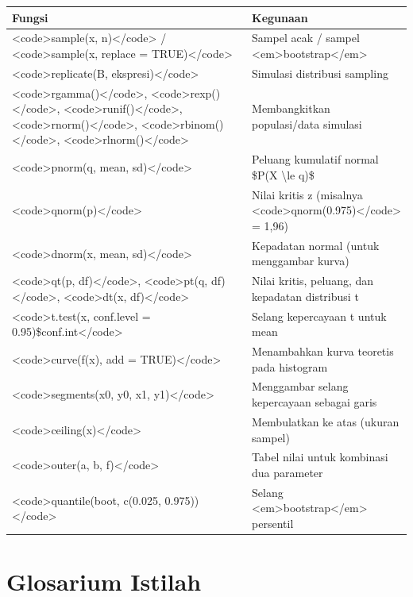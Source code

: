 \documentclass[
  indonesian,
  letterpaper,
]{book}
\begin{document}
\begin{longtable*}[t]{ll}
\toprule
Fungsi & Kegunaan\\
\midrule
<code>sample(x, n)</code> / <code>sample(x, replace = TRUE)</code> & Sampel acak / sampel <em>bootstrap</em>\\
<code>replicate(B, ekspresi)</code> & Simulasi distribusi sampling\\
<code>rgamma()</code>, <code>rexp()</code>, <code>runif()</code>, <code>rnorm()</code>, <code>rbinom()</code>, <code>rlnorm()</code> & Membangkitkan populasi/data simulasi\\
<code>pnorm(q, mean, sd)</code> & Peluang kumulatif normal \$P(X \textbackslash{}le q)\$\\
<code>qnorm(p)</code> & Nilai kritis z (misalnya <code>qnorm(0.975)</code> = 1,96)\\
\addlinespace
<code>dnorm(x, mean, sd)</code> & Kepadatan normal (untuk menggambar kurva)\\
<code>qt(p, df)</code>, <code>pt(q, df)</code>, <code>dt(x, df)</code> & Nilai kritis, peluang, dan kepadatan distribusi t\\
<code>t.test(x, conf.level = 0.95)\$conf.int</code> & Selang kepercayaan t untuk mean\\
<code>curve(f(x), add = TRUE)</code> & Menambahkan kurva teoretis pada histogram\\
<code>segments(x0, y0, x1, y1)</code> & Menggambar selang kepercayaan sebagai garis\\
\addlinespace
<code>ceiling(x)</code> & Membulatkan ke atas (ukuran sampel)\\
<code>outer(a, b, f)</code> & Tabel nilai untuk kombinasi dua parameter\\
<code>quantile(boot, c(0.025, 0.975))</code> & Selang <em>bootstrap</em> persentil\\
\bottomrule
\end{longtable*}
\endgroup{}


\chapter{Glosarium Istilah}\label{glosarium-istilah}

\begingroup\fontsize{12}{14}\selectfont
\end{document}
